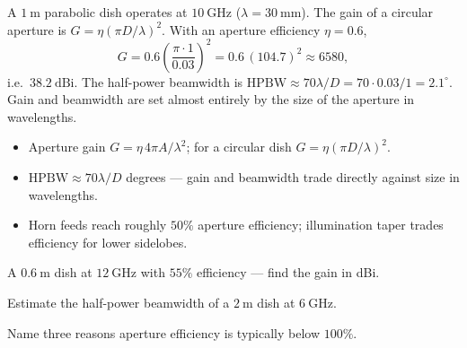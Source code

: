 \begin{workedexample}
A $1\ \text{m}$ parabolic dish operates at $10\ \text{GHz}$ ($\lambda = 30\ \text{mm}$).
The gain of a circular aperture is $G = \eta(\pi D/\lambda)^2$. With an aperture
efficiency $\eta = 0.6$,
\[ G = 0.6\left(\frac{\pi \cdot 1}{0.03}\right)^{2} = 0.6\,(104.7)^2 \approx 6580, \]
i.e.\ $38.2\ \text{dBi}$. The half-power beamwidth is $\text{HPBW}\approx 70\lambda/D
= 70\cdot0.03/1 = 2.1^\circ$. Gain and beamwidth are set almost entirely by the
size of the aperture in wavelengths.
\end{workedexample}

\begin{keytakeaways}
\begin{itemize}[leftmargin=1.4em,itemsep=2pt]
\item Aperture gain $G = \eta\,4\pi A/\lambda^2$; for a circular dish $G = \eta(\pi D/\lambda)^2$.
\item $\text{HPBW}\approx 70\lambda/D$ degrees --- gain and beamwidth trade directly against size in wavelengths.
\item Horn feeds reach roughly $50\%$ aperture efficiency; illumination taper trades efficiency for lower sidelobes.
\end{itemize}
\end{keytakeaways}

\begin{exercises}
\item A $0.6\ \text{m}$ dish at $12\ \text{GHz}$ with $55\%$ efficiency --- find the gain in dBi.
\item Estimate the half-power beamwidth of a $2\ \text{m}$ dish at $6\ \text{GHz}$.
\item Name three reasons aperture efficiency is typically below $100\%$.
\end{exercises}

